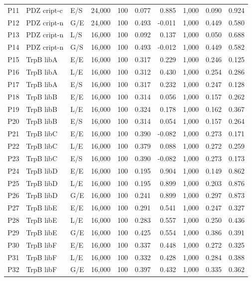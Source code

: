 \begin{longtable}[c]{lllrrrrrrr}
P11 & PDZ cript-c & E/S & 24,000 & 100 & 0.077 & 0.885 & 1,000 & 0.090 & 0.924 \\
P12 & PDZ cript-n & G/E & 24,000 & 100 & 0.493 & -0.011 & 1,000 & 0.449 & 0.580 \\
P13 & PDZ cript-n & L/S & 16,000 & 100 & 0.092 & 0.137 & 1,000 & 0.050 & 0.688 \\
P14 & PDZ cript-n & G/S & 16,000 & 100 & 0.493 & -0.012 & 1,000 & 0.449 & 0.582 \\
P15 & TrpB libA & E/E & 16,000 & 100 & 0.317 & 0.229 & 1,000 & 0.246 & 0.125 \\
P16 & TrpB libA & L/E & 16,000 & 100 & 0.312 & 0.430 & 1,000 & 0.254 & 0.286 \\
P17 & TrpB libA & E/S & 16,000 & 100 & 0.317 & 0.232 & 1,000 & 0.247 & 0.128 \\
P18 & TrpB libB & E/E & 16,000 & 100 & 0.314 & 0.056 & 1,000 & 0.157 & 0.262 \\
P19 & TrpB libB & L/E & 16,000 & 100 & 0.324 & 0.178 & 1,000 & 0.162 & 0.367 \\
P20 & TrpB libB & E/S & 16,000 & 100 & 0.314 & 0.054 & 1,000 & 0.157 & 0.264 \\
P21 & TrpB libC & E/E & 16,000 & 100 & 0.390 & -0.082 & 1,000 & 0.273 & 0.171 \\
P22 & TrpB libC & L/E & 16,000 & 100 & 0.379 & 0.088 & 1,000 & 0.272 & 0.259 \\
P23 & TrpB libC & E/S & 16,000 & 100 & 0.390 & -0.082 & 1,000 & 0.273 & 0.173 \\
P24 & TrpB libD & E/E & 16,000 & 100 & 0.195 & 0.904 & 1,000 & 0.149 & 0.862 \\
P25 & TrpB libD & L/E & 16,000 & 100 & 0.195 & 0.899 & 1,000 & 0.203 & 0.876 \\
P26 & TrpB libD & G/E & 16,000 & 100 & 0.241 & 0.899 & 1,000 & 0.297 & 0.873 \\
P27 & TrpB libE & E/E & 16,000 & 100 & 0.291 & 0.541 & 1,000 & 0.247 & 0.327 \\
P28 & TrpB libE & L/E & 16,000 & 100 & 0.283 & 0.557 & 1,000 & 0.250 & 0.436 \\
P29 & TrpB libE & G/E & 16,000 & 100 & 0.425 & 0.554 & 1,000 & 0.386 & 0.391 \\
P30 & TrpB libF & E/E & 16,000 & 100 & 0.337 & 0.448 & 1,000 & 0.272 & 0.325 \\
P31 & TrpB libF & L/E & 16,000 & 100 & 0.332 & 0.428 & 1,000 & 0.284 & 0.388 \\
P32 & TrpB libF & G/E & 16,000 & 100 & 0.397 & 0.432 & 1,000 & 0.335 & 0.362 \\

\end{longtable}
